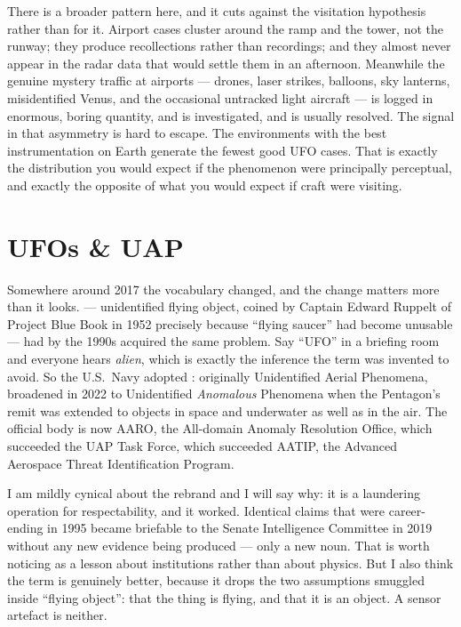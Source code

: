 There is a broader pattern here, and it cuts against the visitation hypothesis rather than for it.
Airport cases cluster around the ramp and the tower, not the runway; they produce recollections
rather than recordings; and they almost never appear in the radar data that would settle them in
an afternoon. Meanwhile the genuine mystery traffic at airports --- drones, laser strikes,
balloons, sky lanterns, misidentified Venus, and the occasional untracked light aircraft --- is
logged in enormous, boring quantity, and is investigated, and is usually resolved. The signal in
that asymmetry is hard to escape. The environments with the best instrumentation on Earth generate
the fewest good UFO cases. That is exactly the distribution you would expect if the phenomenon
were principally perceptual, and exactly the opposite of what you would expect if craft were
visiting.

\section{UFOs \& UAP}\label{sec:uap}

Somewhere around 2017 the vocabulary changed, and the change matters more than it looks.
 --- unidentified flying object, coined by Captain Edward Ruppelt of Project Blue Book in
1952 precisely because ``flying saucer'' had become unusable --- had by the 1990s acquired the same
problem. Say ``UFO'' in a briefing room and everyone hears \emph{alien}, which is exactly the
inference the term was invented to avoid. So the U.S.\ Navy adopted : originally
Unidentified Aerial Phenomena, broadened in 2022 to Unidentified \emph{Anomalous} Phenomena when
the Pentagon's remit was extended to objects in space and underwater as well as in the air. The
official body is now AARO, the All-domain Anomaly Resolution Office, which succeeded the UAP Task
Force, which succeeded AATIP, the Advanced Aerospace Threat Identification Program.

I am mildly cynical about the rebrand and I will say why: it is a laundering operation for
respectability, and it worked. Identical claims that were career-ending in 1995 became briefable to
the Senate Intelligence Committee in 2019 without any new evidence being produced --- only a new
noun. That is worth noticing as a lesson about institutions rather than about physics. But I also
think the term is genuinely better, because it drops the two assumptions smuggled inside
``flying object'': that the thing is flying, and that it is an object. A sensor artefact is neither.

